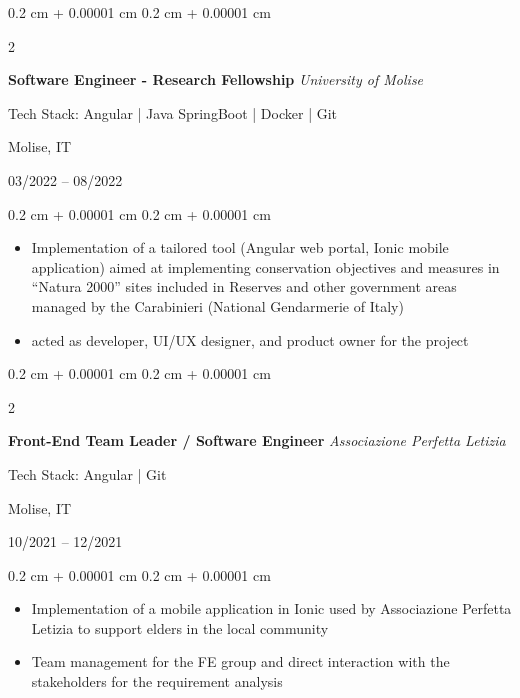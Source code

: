 \documentclass[10pt, letterpaper]{article}
\newenvironment{highlights}{
    \begin{itemize}[
        topsep=0.10 cm,
        parsep=0.10 cm,
        partopsep=0pt,
        itemsep=0pt,
        leftmargin=0.4 cm + 10pt
    ]
}{
    \end{itemize}
} %
\newenvironment{onecolentry}{
    \begin{adjustwidth}{
        0.2 cm + 0.00001 cm
    }{
        0.2 cm + 0.00001 cm
    }
}{
    \end{adjustwidth}
} %
\newenvironment{twocolentry}[2][]{
    \onecolentry
    \def\secondColumn{#2}
    \setcolumnwidth{\fill, 4.5 cm}
    \begin{paracol}{2}
}{
    \switchcolumn \raggedleft \secondColumn
    \end{paracol}
    \endonecolentry
} %
\begin{document}
        \vspace{0.2 cm}
        
        \begin{twocolentry}{
        Molise, IT  
            
        03/2022 – 08/2022}
            \textbf{Software Engineer - Research Fellowship} \textit{University of Molise}

            {\footnotesize Tech Stack: Angular | Java SpringBoot | Docker | Git}
        \end{twocolentry}

        \vspace{0.10 cm}
        \begin{onecolentry}
            \begin{highlights}
                \item Implementation of a tailored tool (Angular web portal, Ionic mobile application) aimed at implementing conservation objectives and measures in ``Natura 2000'' sites included in Reserves and other government areas managed by the Carabinieri (National Gendarmerie of Italy)
                \item acted as developer, UI/UX designer, and product owner for the project
            \end{highlights}
        \end{onecolentry}


        \vspace{0.2 cm}

        \begin{twocolentry}{
        Molise, IT
            
        10/2021 – 12/2021}
            \textbf{Front-End Team Leader / Software Engineer} \textit{Associazione Perfetta Letizia}

            {\footnotesize Tech Stack: Angular | Git }
        \end{twocolentry}

        \vspace{0.10 cm}
        \begin{onecolentry}
            \begin{highlights}
                \item Implementation of a mobile application in Ionic used by Associazione Perfetta Letizia to support elders in the local community
                \item Team management for the FE group and direct interaction with the stakeholders for the requirement analysis
            \end{highlights}
        \end{onecolentry}
\end{document}
